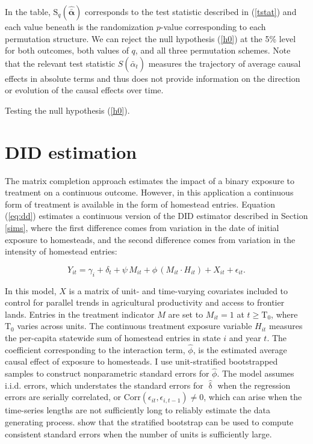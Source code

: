 \documentclass[hidelinks,12pt]{article}
\begin{document}
In the table, $\text{S}_q (\boldsymbol{\hat{\bar{\alpha}}})$ corresponds to the test statistic described in (\ref{tstat}) and each value beneath is the randomization $p$-value corresponding to each permutation structure. We can reject the null hypothesis (\ref{h0}) at the 5\% level for both outcomes, both values of $q$, and all three permutation schemes. Note that the relevant test statistic $S (\hat{\bar{\alpha}}_{t})$ measures the trajectory of average causal effects in absolute terms and thus does not provide information on the direction or evolution of the causal effects over time.

\begin{table}[htbp]
	\captionsetup{font=normalsize}
	\caption{Testing the null hypothesis (\ref{h0}).\label{mc-estimates}}
	\begin{center}
		
	\end{center}
\end{table}

\section{DID estimation} \label{DID}

The matrix completion approach estimates the impact of a binary exposure to treatment on a continuous outcome. However, in this application a continuous form of treatment is available in the form of homestead entries. Equation (\ref{eq:dd}) estimates a continuous version of the DID estimator described in Section \ref{sims}, where the first difference comes from variation in the date of initial exposure to homesteads, and the second difference comes from variation in the intensity of homestead entries:

\begin{equation} 
Y_{it} =  \gamma_i + \delta_t + \psi \, M_{it} + \phi \, (M_{it} \cdot H_{it}) + X_{it}  + \epsilon_{it}. \label{eq:dd} 
\end{equation}

In this model, $X$ is a matrix of unit- and time-varying covariates included to control for parallel trends in agricultural productivity and access to frontier lands. Entries in the treatment indicator $M$ are set to $M_{it} = 1$ at $t \geq  \text{T}_0$, where $\text{T}_0$ varies across units. The continuous treatment exposure variable $H_{it}$ measures the per-capita statewide sum of homestead entries in state $i$ and year $t$. The coefficient corresponding to the interaction term, $\hat{\phi}$, is the estimated average causal effect of exposure to homesteads. I use unit-stratified bootstrapped samples to construct nonparametric standard errors for $\hat{\phi}$. The model assumes i.i.d. errors, which understates the standard errors for $\hat{\updelta}$ when the regression errors are serially correlated, or $\mathrm{Corr} (\epsilon_{it}, \epsilon_{i,t-1}) \neq 0$, which can arise when the time-series lengths are not sufficiently long to reliably estimate the data generating process. \citet{bertrand2004much} show that the stratified bootstrap can be used to compute consistent standard errors when the number of units is sufficiently large. 
\end{document}
